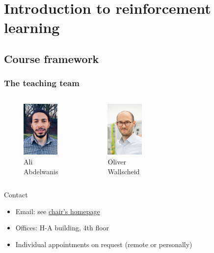 \section{Introduction to reinforcement learning} 

\subsection{Course framework} 

\begin{frame}
	\frametitle{The teaching team}
	\vspace{-0.5cm}
	\begin{columns}[t]
	
		\begin{figure}
			\centering
				\includegraphics[height=2.75cm]{fig/lec01/Abdelwanis.jpg}
				\caption*{Ali \\Abdelwanis}
		\end{figure}
			
		\begin{figure}
			\centering
				\includegraphics[height=2.75cm]{fig/lec01/Wallscheid.jpg}
				\caption*{Oliver\\ Wallscheid}
		\end{figure}
		
	\end{columns}
	\vspace{-0.25cm}
	\begin{varblock}{Contact}
		\begin{itemize}
			\item Email: see \href{https://www.eti.uni-siegen.de/ias/}{chair's homepage}
			\item Offices: H-A building, 4th floor
			\item Individual appointments on request (remote or personally)
		\end{itemize}
	\end{varblock}
	\end{frame}

